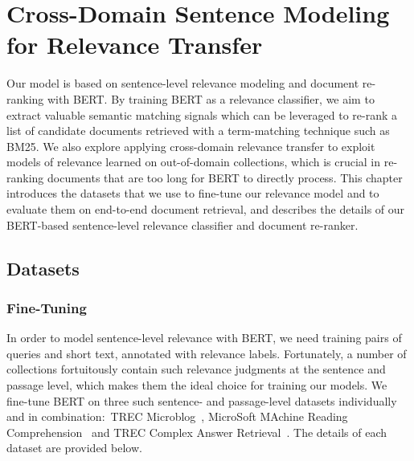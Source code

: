 \chapter{Cross-Domain Sentence Modeling for Relevance Transfer}
\label{ch:model}


Our model is based on sentence-level relevance modeling and document re-ranking with BERT.
By training BERT as a relevance classifier, we aim to extract valuable semantic matching signals which can be leveraged to re-rank a list of candidate documents retrieved with a term-matching technique such as BM25.
We also explore applying cross-domain relevance transfer to exploit models of relevance learned on out-of-domain collections, which is crucial in re-ranking documents that are too long for BERT to directly process.
This chapter introduces the datasets that we use to fine-tune our relevance model and to evaluate them on end-to-end document retrieval, and describes the details of our BERT-based sentence-level relevance classifier and document re-ranker.

\section{Datasets}

\subsection{Fine-Tuning}

In order to model sentence-level relevance with BERT, we need training pairs of queries and short text, annotated with relevance labels.
Fortunately, a number of collections fortuitously contain such relevance judgments at the sentence and passage level, which makes them the ideal choice for training our models.
We fine-tune BERT on three such sentence- and passage-level datasets individually and in combination:\ TREC Microblog~\cite{ounisoverview}, MicroSoft MAchine Reading Comprehension~\cite{nguyen2016msmarco} and TREC Complex Answer Retrieval~\cite{dietz2017trec}.
The details of each dataset are provided below.

